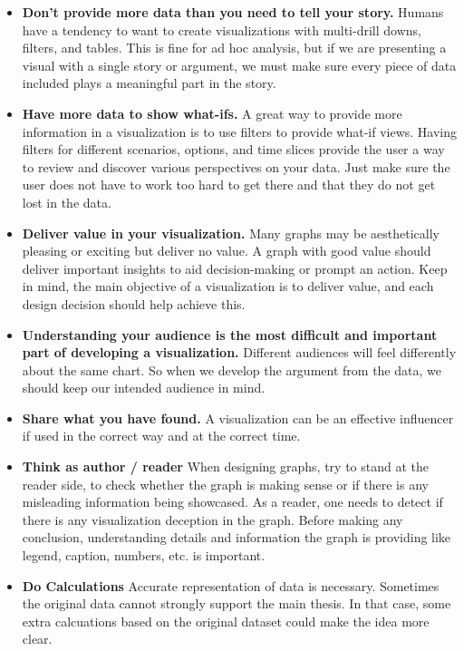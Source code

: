 \documentclass[]{book}
\begin{document}
\begin{itemize}
\item
  \textbf{Don't provide more data than you need to tell your story.} Humans have a tendency to want to create visualizations with multi-drill downs, filters, and tables. This is fine for ad hoc analysis, but if we are presenting a visual with a single story or argument, we must make sure every piece of data included plays a meaningful part in the story.
\item
  \textbf{Have more data to show what-ifs.} A great way to provide more information in a visualization is to use filters to provide what-if views. Having filters for different scenarios, options, and time slices provide the user a way to review and discover various perspectives on your data. Just make sure the user does not have to work too hard to get there and that they do not get lost in the data.
\item
  \textbf{Deliver value in your visualization.} Many graphs may be aesthetically pleasing or exciting but deliver no value. A graph with good value should deliver important insights to aid decision-making or prompt an action. Keep in mind, the main objective of a visualization is to deliver value, and each design decision should help achieve this.
\item
  \textbf{Understanding your audience is the most difficult and important part of developing a visualization.} Different audiences will feel differently about the same chart. So when we develop the argument from the data, we should keep our intended audience in mind.
\item
  \textbf{Share what you have found.} A visualization can be an effective influencer if used in the correct way and at the correct time.
\item
  \textbf{Think as author / reader} When designing graphs, try to stand at the reader side, to check whether the graph is making sense or if there is any misleading information being showcased. As a reader, one needs to detect if there is any visualization deception in the graph. Before making any conclusion, understanding details and information the graph is providing like legend, caption, numbers, etc. is important.
\item
  \textbf{Do Calculations} Accurate representation of data is necessary. Sometimes the original data cannot strongly support the main thesis. In that case, some extra calcuations based on the original dataset could make the idea more clear.
\end{itemize}
\end{document}
